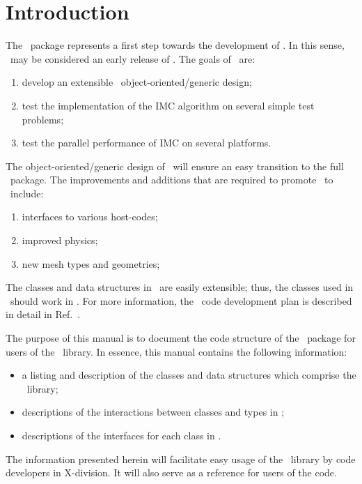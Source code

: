 
\section{Introduction}

The \imctest\ package represents a first step towards the development
of \milagro.  In this sense, \imctest\ may be considered an early
release of \milagro.  The goals of \imctest\ are:
\begin{enumerate}
\item develop an extensible \cpp\ object-oriented/generic design;
\item test the implementation of the IMC algorithm on several simple
  test problems;
\item test the parallel performance of IMC on several platforms.
\end{enumerate}
The object-oriented/generic design of \imctest\ will ensure an easy
transition to the full \milagro\ package.  The improvements and
additions that are required to promote \imctest\ to \milagro\ include:
\begin{enumerate}
\item interfaces to various host-codes;
\item improved physics;
\item new mesh types and geometries;
\end{enumerate}
The classes and data structures in \imctest\ are easily extensible;
thus, the classes used in \imctest\ should work in \milagro. For more
information, the \jayenne\ code development plan is described in
detail in Ref.~.

The purpose of this manual is to document the code structure of the
\imctest\ package for users of the \imctest\ library.  In essence, this
manual contains the following information:
\begin{itemize}
\item a listing and description of the classes and data structures
  which comprise the \imctest\ library;
\item descriptions of the interactions between classes and types in
  \imctest;
\item descriptions of the interfaces for each class in \imctest.
\end{itemize}
The information presented herein will facilitate easy usage of the
\imctest\ library by code developers in X-division.  It will also serve
as a reference for users of the code.


